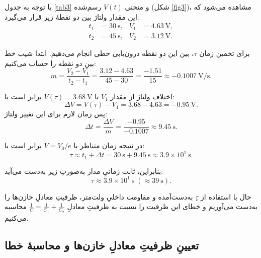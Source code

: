 \documentclass[a4paper, 11pt]{article}
\begin{document}
با توجه به جدول \ref{tab3} و منحنی $V(t)$ رسم‌شده (شکل \ref{fig3})، مشاهده می‌شود که این مقدار ولتاژ بین دو نقطهٔ زیر قرار می‌گیرد:
\[
\begin{aligned}
t_1 &= 30~\mathrm{s}, & V_1 &= 4.63~\mathrm{V},\\
t_2 &= 45~\mathrm{s}, & V_2 &= 3.12~\mathrm{V}.
\end{aligned}
\]

برای تخمین زمان $\tau$، بین این دو نقطه درون‌یابی خطی انجام می‌دهیم. ابتدا شیب خط بین دو نقطه را حساب می‌کنیم:
\begin{equation}
m = \frac{V_2 - V_1}{t_2 - t_1}
  = \frac{3.12 - 4.63}{45 - 30}
  = \frac{-1.51}{15}
  \approx -0.1007~\mathrm{V/s}.
\end{equation}

اختلاف ولتاژ از مقدار $V_1$ تا $V(\tau) = 3.68~\mathrm{V}$ برابر است با:
\begin{equation}
\Delta V = V(\tau) - V_1 = 3.68 - 4.63 = -0.95~\mathrm{V}.
\end{equation}
پس زمان لازم برای این تغییر ولتاژ:
\begin{equation}
\Delta t = \frac{\Delta V}{m}
         = \frac{-0.95}{-0.1007}
         \approx 9.45~\mathrm{s}.
\end{equation}

در نتیجه زمان متناظر با $V = V_0/e$ برابر است با:
\begin{equation}
\tau \approx t_1 + \Delta t = 30~\mathrm{s} + 9.45~\mathrm{s}
     \approx 3.9\times 10^{1}~\mathrm{s}.
\end{equation}

بنابراین، ثابت زمانیِ مدار به‌صورتِ زیر به‌دست می‌آید:
\begin{equation}
\boxed{\tau \approx 3.9\times 10^{1}\ \mathrm{s} \; (\approx 39~\mathrm{s}).}
\end{equation}



حال با استفاده از $\tau$ِ به‌دست‌آمده و مقاومت داخلیِ ولت‌متر، ظرفیتِ معادلِ خازن‌ها را به‌دست می‌آوریم و خطای این ظرفیت را نسبت به ظرفیتِ معادلِ 
\(\frac{1}{C} = \frac{1}{C_1} + \frac{1}{C_2}\)
محاسبه می‌کنیم.

\subsection*{تعیینِ ظرفیتِ معادلِ خازن‌ها و محاسبهٔ خطا}
\end{document}
